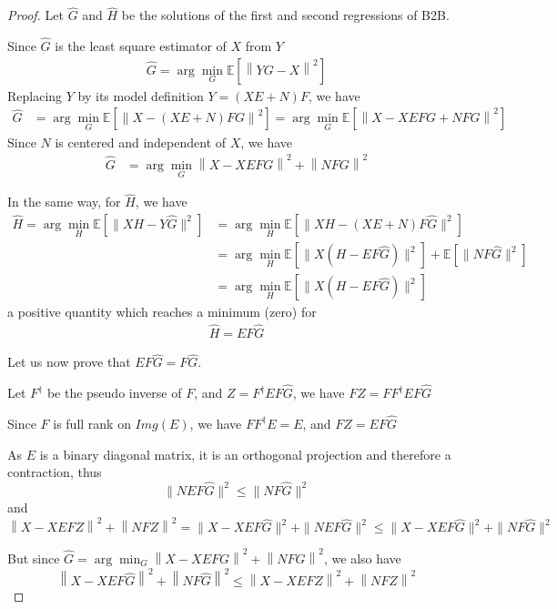 \begin{proof}

 Let $\hat G$ and $\hat H$ be the solutions of the first and second regressions
 of B2B.

 Since $\hat G$ is the least square estimator of $X$ from $Y$
 \begin{align*}
    \hat G = \arg \min_G \mathbb{E}[\left \| YG - X \right \|^2]
\end{align*}
Replacing $Y$ by its model definition $Y = (XE+N)F$, we have
 \begin{align*}
    \hat G &=   \arg \min_G \mathbb{E}[\left \| X - (XE + N)FG \right\|^2] =\arg \min_G \mathbb{E}[\left \| X - XEFG + NFG \right\|^2]
  \end{align*}
  Since $N$ is centered and independent of $X$, we have
  \begin{align}
    	  \hat G &=  \arg \min_G \left \| X - XEFG\right\| ^2  + \left \| NFG\right \| ^2
     \label{eq:Gdoublenorm}
\end{align}

In the same way, for $\hat H$, we have
\begin{align*}
    \hat H = \arg \min_H \mathbb{E}[\| XH - Y \hat{G} \|^2] &=\arg  \min_H \mathbb{E}[\| XH - (XE + N)F \hat G \|^2] \\
    &=\arg \min_H \mathbb{E}[\| X(H - EF \hat G) \| ^2] + \mathbb{E}[\| NF\hat G \| ^2]\\
    &= \arg \min_H \mathbb{E}[\| X(H - EF \hat G) \| ^2]
 \end{align*}
 a positive quantity which reaches a minimum (zero) for
 \begin{align}
    \hat H = EF \hat G
    \label{eq:Hdoublenom}
\end{align}

Let us now prove that $EF\hat G = F\hat G$.

Let $F^\dagger$ be the pseudo inverse of $F$, and $Z=F^\dagger EF\hat G$, we
have $FZ = FF^\dagger EF \hat G$

Since $F$ is full rank on $Img(E)$, we have $FF^\dagger E =E$, and $FZ = EF\hat
G$

As $E$ is a binary diagonal matrix, it is an orthogonal projection and therefore
a contraction, thus
 $$ \| NEF\hat G\|^2 \leq \| NF\hat G \|^2$$ and
 $$\left \| X - XEFZ\right \| ^2  + \left \| NFZ\right \| ^2 = \| X - XEF\hat G \| ^2  + \| NEF\hat G \| ^2 \leq \| X - XEF\hat G \| ^2  + \| NF\hat G \| ^2$$

But since $\hat G =  \arg \min_G \left \| X - XEFG\right\| ^2  + \left \| NFG\right \| ^2$, we also have
$$\left \| X - XEF\hat G\right\| ^2  + \left \| NF\hat G\right \| ^2 \leq \left \| X - XEFZ\right \| ^2  + \left \| NFZ\right \| ^2$$


\end{proof}
